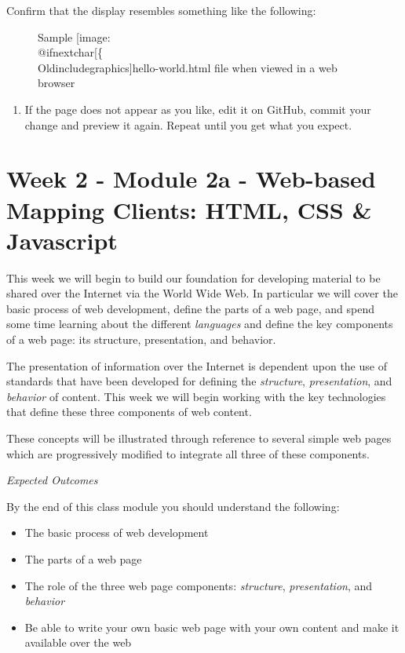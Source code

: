 \documentclass[]{book}
\makeatletter
\providecommand{\tightlist}{%
  \setlength{\itemsep}{0pt}\setlength{\parskip}{0pt}}
\def\ScaleIfNeeded{%
  \ifdim\Gin@nat@width>.5\linewidth
    .5\linewidth
  \else
    \Gin@nat@width
  \fi
}
\let\Oldincludegraphics\texttt{[image: \%
 \\catcode`\\@=11\\relax\%
 \%\\gdef\\includegraphics\{\\@ifnextchar[\{\\Oldincludegraphics]}{\Oldincludegraphics[width=\ScaleIfNeeded]}}%
\gdef\texttt{[image: \\@ifnextchar[\{\\Oldincludegraphics]}{\Oldincludegraphics[max size={.75\textwidth}{.75\textheight}]}}%
\makeatother
\begin{document}
Confirm that the display resembles something like the following:

\begin{figure}[htbp]
\centering
\texttt{[image: images/hello-world.png]}
\caption{Sample \texttt{hello-world.html} file when viewed in a web
browser}
\end{figure}

\begin{enumerate}
\def\labelenumi{\arabic{enumi}.}
\setcounter{enumi}{5}
\tightlist
\item
  If the page does not appear as you like, edit it on GitHub, commit
  your change and preview it again. Repeat until you get what you
  expect.
\end{enumerate}

\chapter{Week 2 - Module 2a - Web-based Mapping Clients: HTML, CSS \&
Javascript}\label{week02}

This week we will begin to build our foundation for developing material
to be shared over the Internet via the World Wide Web. In particular we
will cover the basic process of web development, define the parts of a
web page, and spend some time learning about the different
\emph{languages} and define the key components of a web page: its
structure, presentation, and behavior.

The presentation of information over the Internet is dependent upon the
use of standards that have been developed for defining the
\emph{structure}, \emph{presentation}, and \emph{behavior} of content.
This week we will begin working with the key technologies that define
these three components of web content.

These concepts will be illustrated through reference to several simple
web pages which are progressively modified to integrate all three of
these components.

\emph{Expected Outcomes}

By the end of this class module you should understand the following:

\begin{itemize}
\item
  The basic process of web development
\item
  The parts of a web page
\item
  The role of the three web page components: \emph{structure},
  \emph{presentation}, and \emph{behavior}
\item
  Be able to write your own basic web page with your own content and
  make it available over the web
\end{itemize}
\end{document}
